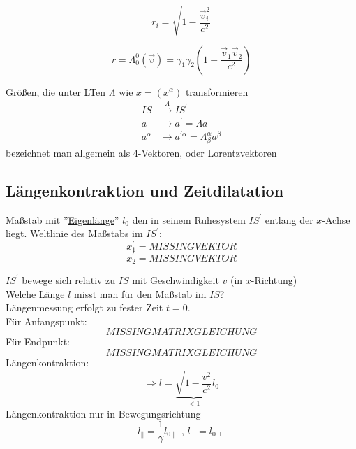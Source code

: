 \documentclass[a4paper, 11pt]{article}
\numberwithin{equation}{section}
\begin{document}
\begin{equation*}
r_i = \sqrt{1-\frac{\vec{v}_i^2}{c^2}}
\end{equation*}

\begin{equation}
r = \Lambda^0_0(\vec{v}) = \gamma_1\gamma_2 \left(1+ \frac{\vec{v}_1 \vec{v}_2}{c^2} \right)
\end{equation}




Größen, die unter LTen $\Lambda$ wie $x=(x^\alpha)$ transformieren
\begin{align*}
IS &\xrightarrow{\Lambda} IS^\prime \\
a &\rightarrow a^\prime = \Lambda a \\
a ^\alpha &\rightarrow a^{\prime \alpha} = \Lambda^\alpha_\beta a ^\beta
\end{align*}
bezeichnet man allgemein als 4-Vektoren, oder Lorentzvektoren

\subsection*{Längenkontraktion und Zeitdilatation}
Maßstab mit ''\underline{Eigenlänge}'' $l_0$ den in seinem Ruhesystem $IS^\prime$ entlang der $x$-Achse liegt. Weltlinie des Maßstabs im $IS^\prime$:
\begin{equation*}
x_1^\prime = MISSINGVEKTOR
\end{equation*}
\begin{equation*}
x_2^\prime = MISSINGVEKTOR
\end{equation*}

$IS^\prime$ bewege sich relativ zu $IS$ mit Geschwindigkeit $v$ (in $x$-Richtung)\\
Welche Länge $l$ misst man für den Maßstab im $IS$? \\
Längenmessung erfolgt zu fester Zeit $t=0$.\\
Für Anfangspunkt:
\begin{equation*}
MISSING MATRIXGLEICHUNG
\end{equation*}
Für Endpunkt:
\begin{equation*}
MISSING MATRIXGLEICHUNG
\end{equation*}
Längenkontraktion:
\begin{equation}
\Rightarrow \boxed{l = \underbrace{\sqrt{1-\frac{v^2}{c^2}}}_{<1} l_0}
\end{equation}
Längenkontraktion nur in Bewegungsrichtung
\begin{equation}
l_\parallel = \dfrac{1}{\gamma} l_{0\parallel} \text{ , } l_\perp = l_{0 \perp}
\end{equation}
\end{document}
